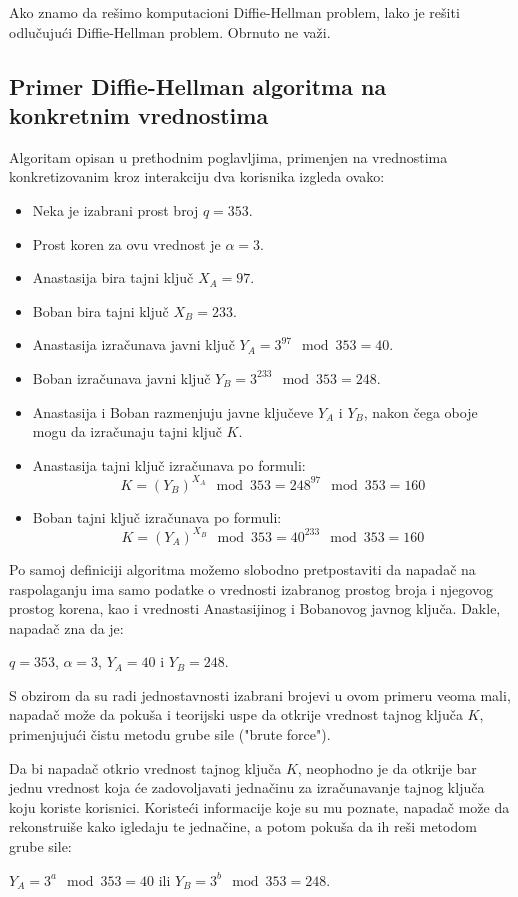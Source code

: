 \documentclass[a4paper]{article}
\begin{document}
Ako znamo da rešimo komputacioni Diffie-Hellman problem, lako je rešiti odlučujući Diffie-Hellman problem.
Obrnuto ne važi. \cite{ddh-vs-cdh}


\subsection{Primer Diffie-Hellman algoritma na konkretnim vrednostima}
\label{sec:primerDH}

Algoritam opisan u prethodnim poglavljima, primenjen na vrednostima konkretizovanim kroz interakciju dva korisnika izgleda ovako:
\begin{itemize}
  \item Neka je izabrani prost broj $q=353$.
  \item Prost koren za ovu vrednost je $\alpha=3$. 
  \item Anastasija bira tajni ključ $X_A=97$. 
  \item Boban bira tajni ključ $X_B=233$.
  \item Anastasija izračunava javni ključ $Y_A=3^{97}\mod353=40$.
  \item Boban izračunava javni ključ $Y_B=3^{233}\mod353=248$.
  \item Anastasija i Boban razmenjuju javne ključeve $Y_A$ i $Y_B$, nakon čega oboje mogu da izračunaju tajni ključ $K$.
  \item Anastasija tajni ključ izračunava po formuli: $$K=(Y_B)^{X_A}\mod353=248^{97}\mod353=160$$
  \item Boban tajni ključ izračunava po formuli: $$K=(Y_A)^{X_B}\mod353=40^{233}\mod353=160$$
\end{itemize}

Po samoj definiciji algoritma možemo slobodno pretpostaviti da napadač na raspolaganju ima samo podatke o vrednosti izabranog prostog broja i njegovog prostog korena, kao i vrednosti Anastasijinog i Bobanovog javnog ključa. Dakle, napadač zna da je: \\\centerline{$q=353$, $\alpha=3$, $Y_A=40$ i $Y_B=248$.}

S obzirom da su radi jednostavnosti izabrani brojevi u ovom primeru veoma mali, napadač može da pokuša i teorijski uspe da otkrije vrednost tajnog ključa $K$, primenjujući čistu metodu grube sile ("brute force").

Da bi napadač otkrio vrednost tajnog ključa $K$, neophodno je da otkrije bar jednu vrednost koja će zadovoljavati jednačinu za izračunavanje tajnog ključa koju koriste korisnici. Koristeći informacije koje su mu poznate, napadač može da rekonstruiše kako igledaju te jednačine, a potom pokuša da ih reši metodom grube sile: \\\centerline{$Y_A=3^a\mod353=40$ ili $Y_B=3^b\mod353=248$.}
\end{document}
